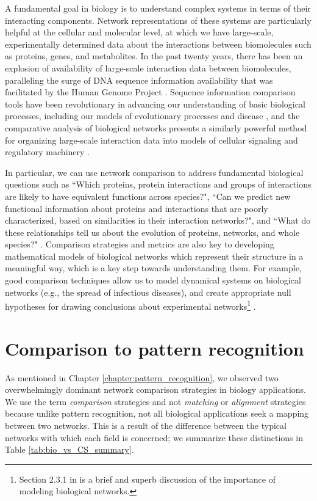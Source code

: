 \documentclass[12pt]{thesis}
\theoremstyle{plain}
\theoremstyle{definition}
\theoremstyle{remark}
\begin{document}
A fundamental goal in biology is to understand complex systems in terms of their interacting components. Network representations of these systems are particularly helpful at the cellular and molecular level, at which we have large-scale, experimentally determined data about the interactions between biomolecules such as proteins, genes, and metabolites. In the past twenty years, there has been an explosion of availability of large-scale interaction data between biomolecules, paralleling the surge of DNA sequence information availability that was facilitated by the Human Genome Project \cite{humanGenomeProject}. Sequence information comparison tools have been revolutionary in advancing our understanding of basic biological processes, including our models of evolutionary processes and disease \cite{HGPimpact}, and the comparative analysis of  biological networks presents a similarly powerful method for organizing large-scale interaction data into models of cellular signaling and regulatory machinery \cite{Sharan_2005}. 

In particular, we can use network comparison to address fundamental biological questions such as ``Which proteins, protein interactions and groups of interactions are likely to have equivalent functions across species?", ``Can we predict new functional information about proteins and interactions that are poorly characterized, based on similarities in their interaction networks?", and ``What do these relationships tell us about the evolution of proteins, networks, and whole species?" \cite{Sharan_2006}. Comparison strategies and metrics are also key to developing mathematical models of biological networks which represent their structure in a meaningful way, which is a key step towards understanding them. For example, good comparison techniques allow us to model dynamical systems on biological networks \cite{Watts_1998} (e.g., the spread of infectious diseases), and create appropriate null hypotheses for drawing conclusions about experimental networks\footnote{Section 2.3.1 in \cite{Hayes_2013} is a brief and superb discussion of the importance of modeling biological networks.}  \cite{Hayes_2013}.

\section{Comparison to pattern recognition}

As mentioned in Chapter \ref{chapter:pattern_recognition}, we observed two overwhelmingly dominant network comparison strategies in biology applications. We  use the term \textit{comparison} strategies and not \textit{matching} or \textit{alignment} strategies because unlike pattern recognition, not all biological applications seek a mapping between two networks. This is a result of the difference between the typical networks with which each field is concerned; we summarize these distinctions in Table \ref{tab:bio_vs_CS_summary}.
\end{document}

